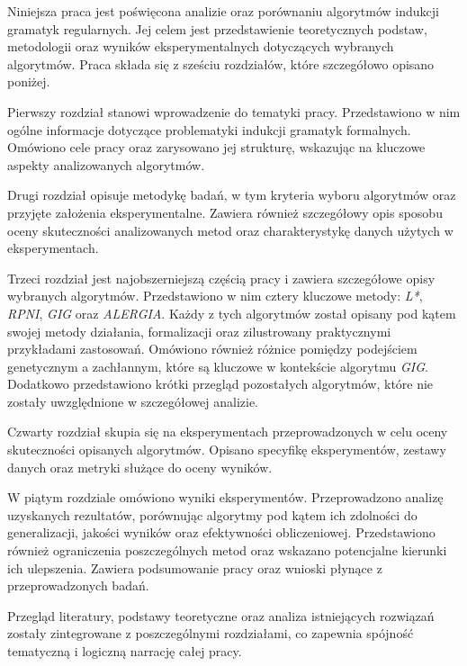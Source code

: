 Niniejsza praca jest poświęcona analizie oraz porównaniu algorytmów indukcji gramatyk regularnych. Jej celem jest przedstawienie teoretycznych podstaw, metodologii oraz wyników eksperymentalnych dotyczących wybranych algorytmów. Praca składa się z sześciu rozdziałów, które szczegółowo opisano poniżej.

Pierwszy rozdział stanowi wprowadzenie do tematyki pracy. Przedstawiono w nim ogólne informacje dotyczące problematyki indukcji gramatyk formalnych. Omówiono cele pracy oraz zarysowano jej strukturę, wskazując na kluczowe aspekty analizowanych algorytmów. 

Drugi rozdział opisuje metodykę badań, w tym kryteria wyboru algorytmów oraz przyjęte założenia eksperymentalne. Zawiera również szczegółowy opis sposobu oceny skuteczności analizowanych metod oraz charakterystykę danych użytych w eksperymentach. 

Trzeci rozdział jest najobszerniejszą częścią pracy i zawiera szczegółowe opisy wybranych algorytmów. Przedstawiono w nim cztery kluczowe metody: \textit{L*}, \textit{RPNI}, \textit{GIG} oraz \textit{ALERGIA}. Każdy z tych algorytmów został opisany pod kątem swojej metody działania, formalizacji oraz zilustrowany praktycznymi przykładami zastosowań. Omówiono również różnice pomiędzy podejściem genetycznym a zachłannym, które są kluczowe w kontekście algorytmu \textit{GIG}. Dodatkowo przedstawiono krótki przegląd pozostałych algorytmów, które nie zostały uwzględnione w szczegółowej analizie.

Czwarty rozdział skupia się na eksperymentach przeprowadzonych w celu oceny skuteczności opisanych algorytmów. Opisano specyfikę eksperymentów, zestawy danych oraz metryki służące do oceny wyników.

W piątym rozdziale omówiono wyniki eksperymentów. Przeprowadzono analizę uzyskanych rezultatów, porównując algorytmy pod kątem ich zdolności do generalizacji, jakości wyników oraz efektywności obliczeniowej. Przedstawiono również ograniczenia poszczególnych metod oraz wskazano potencjalne kierunki ich ulepszenia. Zawiera podsumowanie pracy oraz wnioski płynące z przeprowadzonych badań.

Przegląd literatury, podstawy teoretyczne oraz analiza istniejących rozwiązań zostały zintegrowane z poszczególnymi rozdziałami, co zapewnia spójność tematyczną i logiczną narrację całej pracy.
